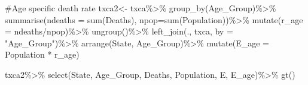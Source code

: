 \documentclass[
  letterpaper,
  DIV=11,
  numbers=noendperiod]{scrreprt}
\newenvironment{Shaded}{\begin{snugshade}}{\end{snugshade}}
\newcommand{\AttributeTok}[1]{\textcolor[rgb]{0.40,0.45,0.13}{#1}}
\newcommand{\CommentTok}[1]{\textcolor[rgb]{0.37,0.37,0.37}{#1}}
\newcommand{\FunctionTok}[1]{\textcolor[rgb]{0.28,0.35,0.67}{#1}}
\newcommand{\NormalTok}[1]{\textcolor[rgb]{0.00,0.23,0.31}{#1}}
\newcommand{\OtherTok}[1]{\textcolor[rgb]{0.00,0.23,0.31}{#1}}
\newcommand{\SpecialCharTok}[1]{\textcolor[rgb]{0.37,0.37,0.37}{#1}}
\newcommand{\StringTok}[1]{\textcolor[rgb]{0.13,0.47,0.30}{#1}}
\begin{document}
\begin{Shaded}
\begin{Highlighting}[]
\CommentTok{\#Age specific death rate}
\NormalTok{txca2}\OtherTok{\textless{}{-}}\NormalTok{ txca}\SpecialCharTok{\%\textgreater{}\%}
  \FunctionTok{group\_by}\NormalTok{(Age\_Group)}\SpecialCharTok{\%\textgreater{}\%}
  \FunctionTok{summarise}\NormalTok{(}\AttributeTok{ndeaths =} \FunctionTok{sum}\NormalTok{(Deaths), }\AttributeTok{npop=}\FunctionTok{sum}\NormalTok{(Population))}\SpecialCharTok{\%\textgreater{}\%}
  \FunctionTok{mutate}\NormalTok{(}\AttributeTok{r\_age =}\NormalTok{ ndeaths}\SpecialCharTok{/}\NormalTok{npop)}\SpecialCharTok{\%\textgreater{}\%}
  \FunctionTok{ungroup}\NormalTok{()}\SpecialCharTok{\%\textgreater{}\%}
  \FunctionTok{left\_join}\NormalTok{(., txca, }\AttributeTok{by =} \StringTok{"Age\_Group"}\NormalTok{)}\SpecialCharTok{\%\textgreater{}\%}
  \FunctionTok{arrange}\NormalTok{(State, Age\_Group)}\SpecialCharTok{\%\textgreater{}\%}
  \FunctionTok{mutate}\NormalTok{(}\AttributeTok{E\_age =}\NormalTok{ Population }\SpecialCharTok{*}\NormalTok{ r\_age)}

\NormalTok{txca2}\SpecialCharTok{\%\textgreater{}\%}
  \FunctionTok{select}\NormalTok{(State, Age\_Group, Deaths, Population, E, E\_age)}\SpecialCharTok{\%\textgreater{}\%}
  \FunctionTok{gt}\NormalTok{()}
\end{Highlighting}
\end{Shaded}
\end{document}
